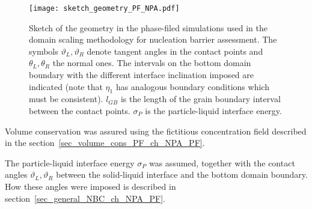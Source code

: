 \begin{figure}
	\centering
%		
%		
%		
	\texttt{[image: sketch\_geometry\_PF\_NPA.pdf]}
	\caption{Sketch of the geometry in the phase-filed simulations used in the domain scaling methodology for nucleation barrier assessment. The symbols $\vartheta_L,\vartheta_R$ denote tangent angles in the contact points and $\theta_L,\theta_R$ the normal ones. The intervals on the bottom domain boundary with the different interface inclination imposed are indicated (note that $\eta_1$ has analogous boundary conditions which must be consistent). $l_{GB}$ is the length of the grain boundary interval between the contact points. $\sigma_P$ is the particle-liquid interface energy.}
	\label{fig_sketch_domain_scaling_PF}
\end{figure}

Volume conservation was assured using the fictitious concentration field described in the section~\ref{sec_volume_cons_PF_ch_NPA_PF}. 

The particle-liquid interface energy $\sigma_P$ was assumed, together with the contact angles $\vartheta_L, \vartheta_R$ between the solid-liquid interface and the bottom domain boundary. How these angles were imposed is described in section~\ref{sec_general_NBC_ch_NPA_PF}.

